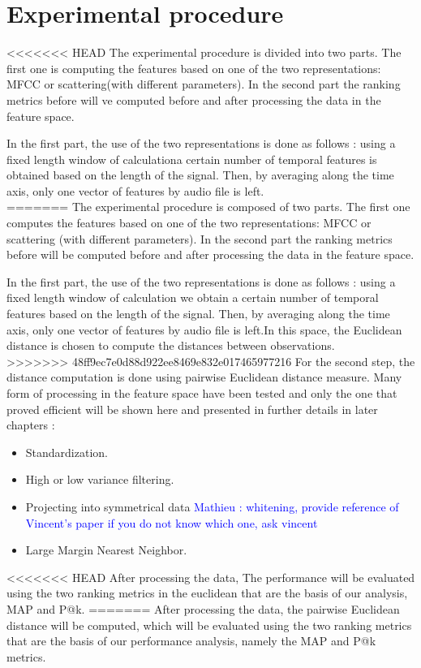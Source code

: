 \documentclass[hidelinks,12pt]{report}
\newcommand{\ml}[1]{\textcolor{blue}{ Mathieu : #1}}
\begin{document}
\section{Experimental procedure}
<<<<<<< HEAD
The experimental procedure is divided into two parts. The first one is computing the features based on one of the two representations: MFCC or scattering(with different parameters). In the second part the ranking metrics before will ve computed before and after processing the data in the feature space.\par
In the first part, the use of the two representations is done as follows : using a fixed length window of calculationa certain number of temporal features is obtained based on the length of the signal. Then, by averaging along the time axis, only one vector of features by audio file is left.\\ 
=======
The experimental procedure is composed of two parts. The first one computes the features based on one of the two representations: MFCC or scattering (with different parameters). In the second part the ranking metrics before will be computed before and after processing the data in the feature space.\par
In the first part, the use of the two representations is done as follows : using a fixed length window of calculation we obtain a certain number of temporal features based on the length of the signal. Then, by averaging along the time axis, only one vector of features by audio file is left.In this space, the Euclidean distance is chosen to compute the distances between observations.\\ 
>>>>>>> 48ff9ec7e0d88d922ee8469e832e017465977216
For the second step, the distance computation is done using pairwise Euclidean distance measure. Many form of processing in the feature space have been tested and only the one that proved efficient will be shown here and presented in further details in later chapters :
\begin{itemize}
\item Standardization.
\item High or low variance filtering.
\item Projecting into symmetrical data \ml{whitening, provide reference of Vincent's paper if you do not know which one, ask vincent} 
\item Large Margin Nearest Neighbor.\cite{W09}\\
\end{itemize}

<<<<<<< HEAD
After processing the data, The performance will be evaluated using the two ranking metrics in the euclidean that are the basis of our analysis, MAP and P@k.
=======
After processing the data, the pairwise Euclidean distance will be computed, which will be evaluated using the two ranking metrics that are the basis of our performance analysis, namely the MAP and P@k metrics.
\end{document}
